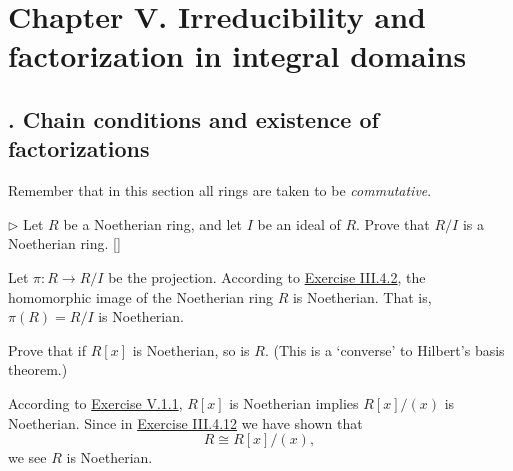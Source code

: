 \section{Chapter V.\hspace{0.2em} Irreducibility and	factorization in integral domains}
\subsection{. Chain conditions and existence of factorizations}
Remember that in this section all rings are taken to be \emph{commutative}.

\hypertarget{Exercise V.1.1}{}
\begin{problem}[1.1]
	$\triangleright$ Let $R$ be a Noetherian ring, and let $I$ be an ideal of $R$. Prove that $R / I$ is a Noetherian ring. []
\end{problem}
\begin{solution}
	Let $\pi:R\to R / I$ be the projection. According to \hyperlink{Exercise III.4.2}{Exercise III.4.2}, the homomorphic image of the Noetherian ring $R$ is Noetherian. That is, $\pi(R)=R / I$ is Noetherian.
\end{solution}

\begin{problem}[1.2]
Prove that if $R[x]$ is Noetherian, so is $R$. (This is a `converse' to Hilbert's basis theorem.)
\end{problem}
\begin{solution}
According to \hyperlink{Exercise V.1.1}{Exercise V.1.1}, $R[x]$ is Noetherian implies $R\left[x\right]/\left(x\right)$ is Noetherian. Since in \hyperlink{Exercise III.4.12}{Exercise III.4.12} we have shown that
\[
R\cong R\left[x\right]/\left(x\right),
\]
we see $R$ is Noetherian.
\end{solution}

